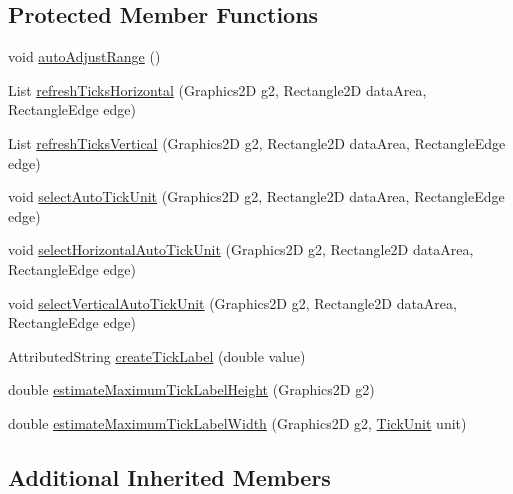 \subsection*{Protected Member Functions}
\begin{DoxyCompactItemize}
\item 
void \mbox{\hyperlink{classorg_1_1jfree_1_1chart_1_1axis_1_1_log_axis_ad85aea53b1d4ac0e9e5e45a2bac3fc61}{auto\+Adjust\+Range}} ()
\item 
List \mbox{\hyperlink{classorg_1_1jfree_1_1chart_1_1axis_1_1_log_axis_a3f320e1cea41221f38d2446860874950}{refresh\+Ticks\+Horizontal}} (Graphics2D g2, Rectangle2D data\+Area, Rectangle\+Edge edge)
\item 
List \mbox{\hyperlink{classorg_1_1jfree_1_1chart_1_1axis_1_1_log_axis_aa8120494227454b62b875dea4ff549c9}{refresh\+Ticks\+Vertical}} (Graphics2D g2, Rectangle2D data\+Area, Rectangle\+Edge edge)
\item 
void \mbox{\hyperlink{classorg_1_1jfree_1_1chart_1_1axis_1_1_log_axis_a2a3430c6ac65fc61caa25c14e9d61863}{select\+Auto\+Tick\+Unit}} (Graphics2D g2, Rectangle2D data\+Area, Rectangle\+Edge edge)
\item 
void \mbox{\hyperlink{classorg_1_1jfree_1_1chart_1_1axis_1_1_log_axis_a8328cd149cb7cc93dac6922d5e9f412e}{select\+Horizontal\+Auto\+Tick\+Unit}} (Graphics2D g2, Rectangle2D data\+Area, Rectangle\+Edge edge)
\item 
void \mbox{\hyperlink{classorg_1_1jfree_1_1chart_1_1axis_1_1_log_axis_ae1ea3a4d597239520bbe888790473ac3}{select\+Vertical\+Auto\+Tick\+Unit}} (Graphics2D g2, Rectangle2D data\+Area, Rectangle\+Edge edge)
\item 
Attributed\+String \mbox{\hyperlink{classorg_1_1jfree_1_1chart_1_1axis_1_1_log_axis_a5a2c7ea6473133446a8d18b3eb572c81}{create\+Tick\+Label}} (double value)
\item 
double \mbox{\hyperlink{classorg_1_1jfree_1_1chart_1_1axis_1_1_log_axis_a9057a68cc052c81b598172978b569f4d}{estimate\+Maximum\+Tick\+Label\+Height}} (Graphics2D g2)
\item 
double \mbox{\hyperlink{classorg_1_1jfree_1_1chart_1_1axis_1_1_log_axis_a5a6535b6425eb8471377055ae7df3c7d}{estimate\+Maximum\+Tick\+Label\+Width}} (Graphics2D g2, \mbox{\hyperlink{classorg_1_1jfree_1_1chart_1_1axis_1_1_tick_unit}{Tick\+Unit}} unit)
\end{DoxyCompactItemize}
\subsection*{Additional Inherited Members}


